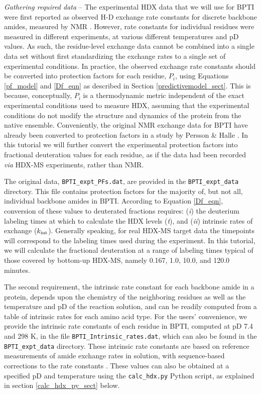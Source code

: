 \documentclass[9pt,tutorial]{livecoms}
\begin{document}
\textit{Gathering required data} -- The experimental HDX data that we will use for BPTI were first reported as observed H-D exchange rate constants for discrete backbone amides, measured by NMR \cite{Kim1993, Battiste2002}. 
However, rate constants for individual residues were measured in different experiments, at various different temperatures and pD values.
As such, the residue-level exchange data cannot be combined into a single data set without first standardizing the exchange rates to a single set of experimental conditions.
In practice, the observed exchange rate constants should be converted into protection factors for each residue, $P_i$, using Equations \ref{pf_model} and \ref{Df_eqn} as described in Section \ref{predictivemodel_sect}.
This is because, conceptually, $P_i$ is a thermodynamic metric independent of the exact experimental conditions used to measure HDX, assuming that the experimental conditions do not modify the structure and dynamics of the protein from the native ensemble.
Conveniently, the original NMR exchange data for BPTI have already been converted to protection factors in a study by Persson \& Halle \cite{Persson2015}.
In this tutorial we will further convert the experimental protection factors into fractional deuteration values for each residue, as if the data had been recorded \textit{via} HDX-MS experiments, rather than NMR. 

The original data, \texttt{BPTI\_expt\_PFs.dat}, are provided in the \texttt{BPTI\_expt\_data} directory.
This file contains protection factors for the majority of, but not all, individual backbone amides in BPTI.
According to Equation \ref{Df_eqn}, conversion of these values to deuterated fractions requires: (\textit{i}) the deuterium labeling times at which to calculate the HDX levels (\textit{t}), and (\textit{ii}) intrinsic rates of exchange ($k_\textnormal{int}$).
Generally speaking, for real HDX-MS target data the timepoints will correspond to the labeling times used during the experiment.
In this tutorial, we will calculate the fractional deuteration at a range of labeling times typical of those covered by bottom-up HDX-MS, namely 0.167, 1.0, 10.0, and 120.0 minutes. 

The second requirement, the intrinsic rate constant for each backbone amide in a protein, depends upon the chemistry of the neighboring residues as well as the temperature and pD of the reaction solution, and can be readily computed from a table of intrinsic rates for each amino acid type.
For the users' convenience, we provide the intrinsic rate constants of each residue in BPTI, computed at pD 7.4 and 298 K, in the file \texttt{BPTI\_Intrinsic\_rates.dat}, which can also be found in the \texttt{BPTI\_expt\_data} directory.
These intrinsic rate constants are based on reference measurements of amide exchange rates in solution, with sequence-based corrections to the rate constants \cite{Bai1993, Nguyen2018}.
These values can also be obtained at a specified pD and temperature using the \texttt{calc\_hdx.py} Python script, as explained in section \ref{calc_hdx_py_sect} below.
\end{document}
